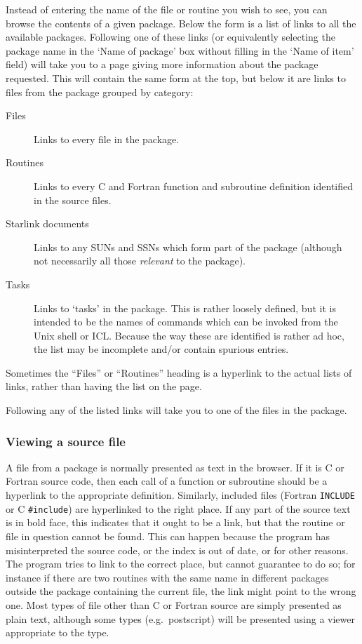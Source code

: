 \documentclass[twoside,11pt]{article}
\newcommand{\xlabel}[1]{}
\renewcommand{\_}{\texttt{\symbol{95}}}
\begin{document}
Instead of entering the name of the file or routine you wish to
see, you can browse the contents of a given package.
Below the form is a list of links to all the available packages.
Following one of these links (or equivalently selecting the package
name in the `Name of package' box without filling in the `Name of item'
field) will take you to a page giving more information about the 
package requested.
This will contain the same form at the top, 
but below it are links to files from the package grouped by category:
\begin{description}
\item[Files]
Links to every file in the package.
\item[Routines]
Links to every C and Fortran function and subroutine definition 
identified in the source files.
\item[Starlink documents]
Links to any SUNs and SSNs which form part of the package
(although not necessarily all those {\it relevant\/} to the package).
\item[Tasks]
Links to `tasks' in the package.
This is rather loosely defined, but it is intended to be
the names of commands which can be invoked from the Unix shell or ICL.
Because the way these are identified is rather ad hoc,
the list may be incomplete and/or contain spurious entries.
\end{description}
Sometimes the ``Files'' or ``Routines'' heading is a hyperlink to 
the actual lists of links, rather than having the list on the page.

Following any of the listed links 
will take you to one of the files in the package.

\subsubsection{\xlabel{sec:view}\label{sec:view}Viewing a source file}

A file from a package is normally presented as text in the browser.
If it is C or Fortran source code, then each call of a function or
subroutine should be a hyperlink to the appropriate definition.
Similarly, included files (Fortran {\tt INCLUDE} or C {\tt \#include}) 
are hyperlinked to the right place.
If any part of the source text is in bold face,
this indicates that it ought to be a link,
but that the routine or file in question cannot be found. 
This can happen because the program has misinterpreted the source code,
or the index is out of date, or for other reasons.
The program tries to link to the correct place, 
but cannot guarantee to do so; for instance if there are two 
routines with the same name in different packages outside the
package containing the current file, the link might point to
the wrong one.
Most types of file other than C or Fortran source are 
simply presented as plain text, although some types
(e.g.\ postscript)
will be presented using a viewer appropriate to the type.
\end{document}
